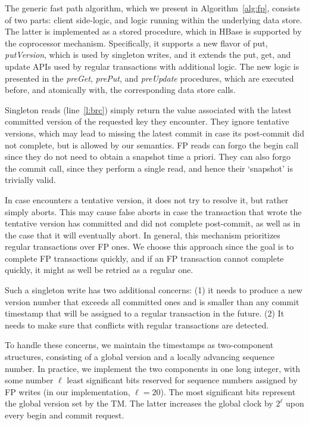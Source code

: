 The generic fast  path algorithm, which we present in Algorithm~\ref{alg:fp}, consists of two parts: 
client side-logic, and logic running within the underlying data store. 
The latter is implemented as a stored procedure, which in HBase is supported by the coprocessor mechanism. 
Specifically, it supports a new flavor of put, \emph{putVersion}, which is used by singleton writes, 
and it extends the put, get, and update APIs used by regular transactions with additional logic.  
The new logic is presented in the \emph{preGet}, \emph{prePut}, and \emph{preUpdate} procedures, 
which are  executed before, and atomically with, the corresponding data store calls.

Singleton reads (line~\ref{l:brc}) simply return the value associated with the  latest committed version of the requested key they encounter.  
They ignore tentative versions, which may lead to missing the latest commit in case its post-commit did not complete, 
but is allowed by our semantics. 
FP reads can forgo the begin call since they do not need to obtain a snapshot time a priori. 
They can also forgo the commit call, since they perform a single read, and hence their `snapshot' is trivially valid.

In case   encounters a tentative version, it does not try to resolve it, but rather simply aborts.
This may cause false aborts in case the transaction that wrote the tentative version has committed and did not 
complete post-commit, as well as in the case that it will eventually abort. 
In general, this mechanism prioritizes regular transactions over FP ones. We choose this approach since
the goal is to complete FP transactions quickly, and if an FP transaction cannot complete quickly, it might as well be 
retried as a regular one.
   
Such a singleton write has two additional concerns: (1) it needs to  produce a new version number that exceeds all committed ones and
is smaller than any commit timestamp that will be assigned to a regular transaction in the future.
(2)  It needs to make sure that conflicts with regular transactions are detected. 

To handle these concerns,  
we maintain the timestamps as two-component structures, consisting of a global version and a locally advancing sequence number.
In practice, we implement the two components in one long integer, with some number $\ell$ least significant bits
reserved for sequence numbers assigned by FP writes (in our implementation, $\ell=20$).
The most significant bits represent the global version set by the TM. The latter increases 
the global clock by $2^\ell$ upon every begin and commit request.

